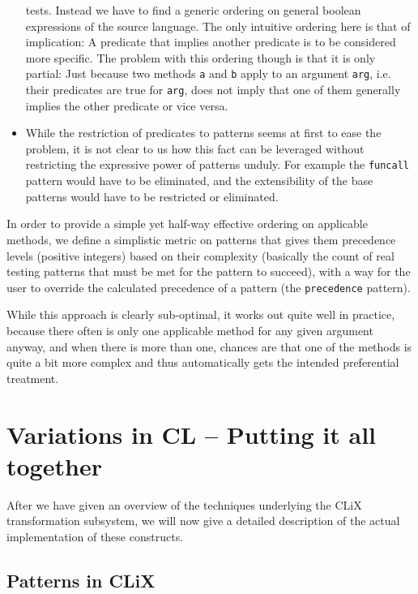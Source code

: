 \documentclass[a4paper,11pt]{scrartcl}
\begin{document}
\begin{itemize}
  tests.  Instead we have to find a generic ordering on general
  boolean expressions of the source language.  The only intuitive
  ordering here is that of implication:  A predicate that implies
  another predicate is to be considered more specific.  The problem
  with this ordering though is that it is only partial:  Just because
  two methods \texttt{a} and \texttt{b} apply to an argument
  \texttt{arg}, i.e. their predicates are true for \texttt{arg}, does
  not imply that one of them generally implies the other predicate or
  vice versa.
\item While the restriction of predicates to patterns seems at first
  to ease the problem, it is not clear to us how this fact can be
  leveraged without restricting the expressive power of patterns
  unduly.  For example the \texttt{funcall} pattern would have to be
  eliminated, and the extensibility of the base patterns would have to
  be restricted or eliminated.
\end{itemize}

In order to provide a simple yet half-way effective ordering on
applicable methods, we define a simplistic metric on patterns that
gives them precedence levels (positive integers) based on their
complexity (basically the count of real testing patterns that must be
met for the pattern to succeed), with a way for the user to override
the calculated precedence of a pattern (the \texttt{precedence}
pattern).

While this approach is clearly sub-optimal, it works out quite well in
practice, because there often is only one applicable method for any
given argument anyway, and when there is more than one, chances are
that one of the methods is quite a bit more complex and thus
automatically gets the intended preferential treatment.


\section{Variations in CL -- Putting it all together}
\label{sec:variations}

After we have given an overview of the techniques underlying the CLiX
transformation subsystem, we will now give a detailed description of
the actual implementation of these constructs.

\subsection{Patterns in CLiX}
\label{sec:patterns}
\end{document}
